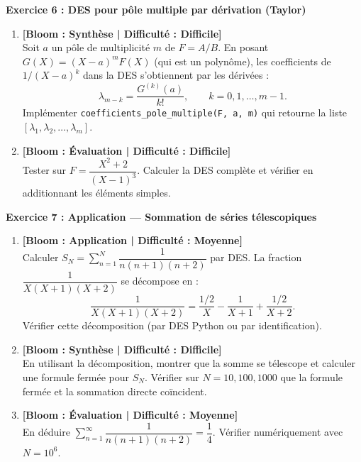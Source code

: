 \documentclass[12pt,a4paper]{report}
\theoremstyle{definition}
\theoremstyle{remark}
\begin{document}
\vspace{0.3cm}

\noindent\textbf{Exercice 6 : DES pour pôle multiple par dérivation (Taylor)}
\begin{enumerate}
    \item \textbf{[Bloom : Synthèse | Difficulté : Difficile]} \\
    Soit $a$ un pôle de multiplicité $m$ de $F = A/B$. En posant $G(X) = (X - a)^m F(X)$ (qui est un polynôme), les coefficients de $1/(X-a)^k$ dans la DES s'obtiennent par les dérivées :
    \[ \lambda_{m - k} = \frac{G^{(k)}(a)}{k!}, \qquad k = 0, 1, \dots, m - 1. \]
    Implémenter \texttt{coefficients\_pole\_multiple(F, a, m)} qui retourne la liste $[\lambda_1, \lambda_2, \dots, \lambda_m]$.
    \item \textbf{[Bloom : Évaluation | Difficulté : Difficile]} \\
    Tester sur $F = \dfrac{X^2 + 2}{(X - 1)^3}$. Calculer la DES complète et vérifier en additionnant les éléments simples.
\end{enumerate}

\vspace{0.3cm}

\noindent\textbf{Exercice 7 : Application --- Sommation de séries télescopiques}
\begin{enumerate}
    \item \textbf{[Bloom : Application | Difficulté : Moyenne]} \\
    Calculer $\displaystyle S_N = \sum_{n=1}^{N} \dfrac{1}{n(n+1)(n+2)}$ par DES. La fraction $\dfrac{1}{X(X+1)(X+2)}$ se décompose en :
    \[ \frac{1}{X(X+1)(X+2)} = \frac{1/2}{X} - \frac{1}{X+1} + \frac{1/2}{X+2}. \]
    Vérifier cette décomposition (par DES Python ou par identification).
    \item \textbf{[Bloom : Synthèse | Difficulté : Difficile]} \\
    En utilisant la décomposition, montrer que la somme se télescope et calculer une formule fermée pour $S_N$. Vérifier sur $N = 10, 100, 1000$ que la formule fermée et la sommation directe coïncident.
    \item \textbf{[Bloom : Évaluation | Difficulté : Moyenne]} \\
    En déduire $\sum_{n=1}^{\infty} \dfrac{1}{n(n+1)(n+2)} = \dfrac{1}{4}$. Vérifier numériquement avec $N = 10^6$.
\end{enumerate}

\vspace{0.3cm}
\end{document}

